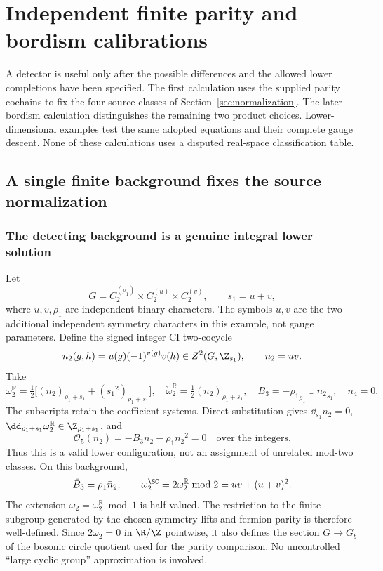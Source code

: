 \section{Independent finite parity and bordism calibrations}\label{app:physical-tests}
A detector is useful only after the possible differences and the allowed lower completions have been specified. The first calculation uses the supplied parity cochains to fix the four source classes of Section~\ref{sec:normalization}. The later bordism calculation distinguishes the remaining two product choices. Lower-dimensional examples test the same adopted equations and their complete gauge descent. None of these calculations uses a disputed real-space classification table.

\subsection{A single finite background fixes the source normalization}\label{subsec:finite-calibration}\label{sec:calibration04}
\subsubsection{The detecting background is a genuine integral lower solution}
Let
\begin{equation}\label{eq:detectG04}
G=C_2^{({\rho_1})}\times C_2^{(u)}\times C_2^{(v)},\qquad {s_1}=u+v,
\end{equation}
where $u,v,{\rho_1}$ are independent binary characters. The symbols $u,v$ are the two additional independent symmetry characters in this example, not gauge parameters. Define the signed integer CI two-cocycle
\begin{equation}\label{eq:detectk04}
{n_2}(g,h)=u(g)(-1)^{v(g)}v(h)\in Z^2(G,\Z_{s_1}),\qquad \bar n_2=uv.
\end{equation}
Take
\begin{equation}\label{eq:detecta04}
\boxed{\omega_2^{\mathbb R}=\tfrac12\bigl[({n_2})_{\rho_1+s_1}+({s_1}^2)_{\rho_1+s_1}\bigr],\quad
\check\omega_2^{\mathbb R}=\tfrac12({n_2})_{\rho_1+s_1},\quad B_3=-{\rho_1}_{\rho_1}\cup {n_2}_{s_1},\quad n_4=0.}
\end{equation}
The subscripts retain the coefficient systems. Direct substitution gives $\dd_{s_1}{n_2}=0$, $\dd_{\rho_1+s_1}\omega_2^{\mathbb R}\in\Z_{\rho_1+s_1}$, and
\begin{equation}
\mathcal O_5({n_2})=-B_3{n_2}-{\rho_1}{n_2}^2=0\quad\text{over the integers}.
\end{equation}
Thus this is a valid lower configuration, not an assignment of unrelated mod-two classes. On this background,
\begin{equation}
\bar B_3={\rho_1}{\bar n_2},\qquad \omega_2^{\SC}=2\omega_2^{\mathbb R}\bmod2=uv+(u+v)^2.
\end{equation}
The extension $\omega_2=\omega_2^{\mathbb R}\bmod1$ is half-valued. The restriction to the finite subgroup generated by the chosen symmetry lifts and fermion parity is therefore well-defined. Since $2\omega_2=0$ in $\R/\Z$ pointwise, it also defines the section $G\to G_b$ of the bosonic circle quotient used for the parity comparison. No uncontrolled ``large cyclic group'' approximation is involved.


